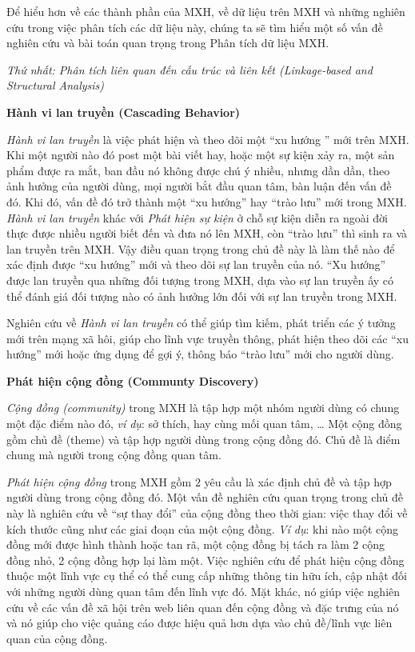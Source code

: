 \documentclass[12pt]{extarticle}
\begin{document}
			\par Để hiểu hơn về các thành phần của MXH, về dữ liệu trên MXH và những nghiên cứu trong việc phân tích các dữ liệu này, chúng ta sẽ tìm hiểu một số vấn đề nghiên cứu và bài toán quan trọng trong Phân tích dữ liệu MXH. 
			\par \textit{Thứ nhất: Phân tích liên quan đến cấu trúc và liên kết (Linkage-based and Structural Analysis)}
			\par \textbf{Hành vi lan truyền (Cascading Behavior)}
			\par \textit{Hành vi lan truyền} là việc phát hiện và theo dõi một “xu hướng ” mới trên MXH. Khi một người nào đó post một bài viết hay, hoặc một sự kiện xảy ra, một sản phẩm được ra mắt, ban đầu nó không được chú ý nhiều, nhưng dần dần, theo ảnh hưởng của người dùng, mọi người bắt đầu quan tâm, bàn luận đến vấn đề đó. Khi đó, vấn đề đó trở thành một “xu hướng” hay “trào lưu” mới trong MXH. \textit{Hành vi lan truyền} khác với \textit{Phát hiện sự kiện} ở chỗ sự kiện diễn ra ngoài đời thực được nhiều người biết đến và đưa nó lên MXH, còn “trào lưu” thì sinh ra và lan truyền trên MXH. Vậy điều quan trọng trong chủ đề này là làm thế nào để xác định được “xu hướng” mới và theo dõi sự lan truyền của nó. “Xu hướng” được lan truyền qua những đối tượng trong MXH, dựa vào sự lan truyền ấy có thể đánh giá đối tượng nào có ảnh hưởng lớn đối với sự lan truyền trong MXH.
			\par Nghiên cứu về \textit{Hành vi lan truyền} có thể giúp tìm kiếm, phát triển các ý tưởng mới trên mạng xã hôi, giúp cho lĩnh vực truyền thông, phát hiện theo dõi các “xu hướng” mới hoặc ứng dụng để gợi ý, thông báo “trào lưu” mới cho người dùng.
			\par \textbf{Phát hiện cộng đồng (Communty Discovery)}
			\par \textit{Cộng đồng (community)} trong MXH là tập hợp một nhóm người dùng có chung một đặc điểm nào đó, \textit{ví dụ}: sở thích, hay cùng mối quan tâm, …  Một cộng đồng gồm chủ đề (theme) và tập hợp người dùng trong cộng đồng đó. Chủ đề là điểm chung mà người trong cộng đồng quan tâm.
			\par \textit{Phát hiện cộng đồng} trong MXH gồm 2 yêu cầu là xác định chủ đề và tập hợp người dùng trong cộng đồng đó. Một vấn đề nghiên cứu quan trọng trong chủ đề này là nghiên cứu về “sự thay đổi” của cộng đồng theo thời gian: việc thay đổi về kích thước cũng như các giai đoạn của một cộng đồng. \textit{Ví dụ}: khi nào một cộng đồng mới được hình thành hoặc tan rã, một cộng đồng bị tách ra làm 2 cộng đồng nhỏ, 2 cộng đồng hợp lại làm một. Việc nghiên cứu để phát hiện cộng đồng thuộc một lĩnh vực cụ thể có thể cung cấp những thông tin hữu ích, cập nhật đối với những người dùng quan tâm đến lĩnh vực đó. Mặt khác, nó giúp việc nghiên cứu về các vấn đề xã hội trên web liên quan đến cộng đồng và đặc trưng của nó và nó giúp cho việc quảng cáo được hiệu quả hơn dựa vào chủ đề/lĩnh vực liên quan của cộng đồng.
\end{document}
